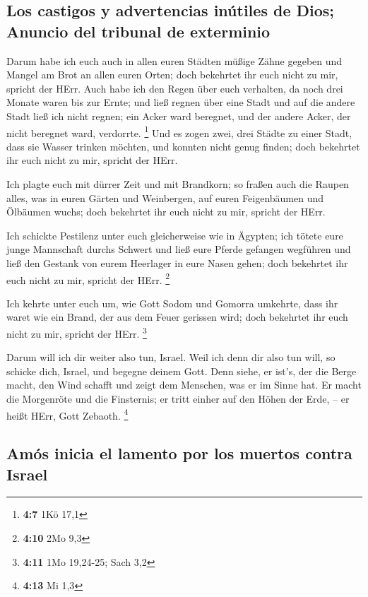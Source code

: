\hypertarget{los-castigos-y-advertencias-inuxfatiles-de-dios-anuncio-del-tribunal-de-exterminio}{%
\subsection{Los castigos y advertencias inútiles de Dios; Anuncio del
tribunal de
exterminio}\label{los-castigos-y-advertencias-inuxfatiles-de-dios-anuncio-del-tribunal-de-exterminio}}

 Darum habe ich euch auch in allen euren Städten müßige
Zähne gegeben und Mangel am Brot an allen euren Orten; doch bekehrtet
ihr euch nicht zu mir, spricht der HErr.  Auch habe ich
den Regen über euch verhalten, da noch drei Monate waren bis zur Ernte;
und ließ regnen über eine Stadt und auf die andere Stadt ließ ich nicht
regnen; ein Acker ward beregnet, und der andere Acker, der nicht
beregnet ward, verdorrte. \footnote{\textbf{4:7} 1Kö 17,1}
 Und es zogen zwei, drei Städte zu einer Stadt, dass sie
Wasser trinken möchten, und konnten nicht genug finden; doch bekehrtet
ihr euch nicht zu mir, spricht der HErr.

 Ich plagte euch mit dürrer Zeit und mit Brandkorn; so
fraßen auch die Raupen alles, was in euren Gärten und Weinbergen, auf
euren Feigenbäumen und Ölbäumen wuchs; doch bekehrtet ihr euch nicht zu
mir, spricht der HErr.

 Ich schickte Pestilenz unter euch gleicherweise wie in
Ägypten; ich tötete eure junge Mannschaft durchs Schwert und ließ eure
Pferde gefangen wegführen und ließ den Gestank von eurem Heerlager in
eure Nasen gehen; doch bekehrtet ihr euch nicht zu mir, spricht der
HErr. \footnote{\textbf{4:10} 2Mo 9,3}

 Ich kehrte unter euch um, wie Gott Sodom und Gomorra
umkehrte, dass ihr waret wie ein Brand, der aus dem Feuer gerissen wird;
doch bekehrtet ihr euch nicht zu mir, spricht der HErr. \footnote{\textbf{4:11}
  1Mo 19,24-25; Sach 3,2}

 Darum will ich dir weiter also tun, Israel. Weil ich
denn dir also tun will, so schicke dich, Israel, und begegne deinem
Gott.  Denn siehe, er ist's, der die Berge macht, den
Wind schafft und zeigt dem Menschen, was er im Sinne hat. Er macht die
Morgenröte und die Finsternis; er tritt einher auf den Höhen der Erde,
-- er heißt HErr, Gott Zebaoth. \footnote{\textbf{4:13} Mi 1,3}

\hypertarget{amuxf3s-inicia-el-lamento-por-los-muertos-contra-israel}{%
\subsection{Amós inicia el lamento por los muertos contra
Israel}\label{amuxf3s-inicia-el-lamento-por-los-muertos-contra-israel}}

